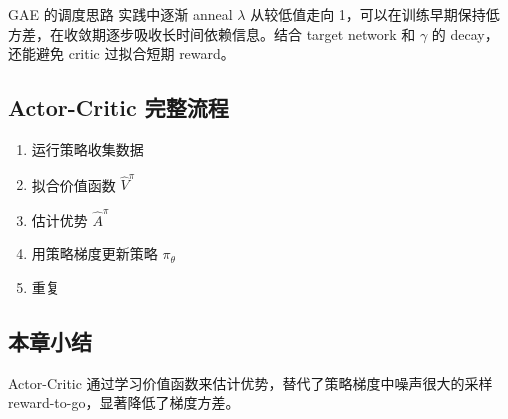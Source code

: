 \begin{importantbox}{GAE 的调度思路}
实践中逐渐 anneal $\lambda$ 从较低值走向 1，可以在训练早期保持低方差，在收敛期逐步吸收长时间依赖信息。结合 target network 和 $\gamma$ 的 decay，还能避免 critic 过拟合短期 reward。
\end{importantbox}

\subsection{Actor-Critic 完整流程}

\begin{enumerate}
    \item 运行策略收集数据
    \item 拟合价值函数 $\hat{V}^\pi$
    \item 估计优势 $\hat{A}^\pi$
    \item 用策略梯度更新策略 $\pi_\theta$
    \item 重复
\end{enumerate}

\subsection{本章小结}

Actor-Critic 通过学习价值函数来估计优势，替代了策略梯度中噪声很大的采样 reward-to-go，显著降低了梯度方差。

